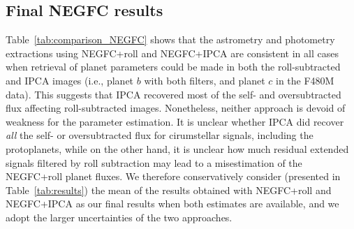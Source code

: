 \documentclass[longauth]{aa}
\begin{document}
\begin{appendix}
\subsection{Final NEGFC results} 

Table~\ref{tab:comparison_NEGFC} shows that the astrometry and photometry extractions using NEGFC+roll and NEGFC+IPCA are consistent in all cases when retrieval of planet parameters could be made in both the roll-subtracted and IPCA images (i.e., planet $b$ with both filters, and planet $c$ in the F480M data). This suggests that IPCA recovered most of the self- and oversubtracted flux affecting roll-subtracted images. Nonetheless, neither approach is devoid of weakness for the parameter estimation. It is unclear whether IPCA did recover \textit{all} the self- or oversubtracted flux for cirumstellar signals, including the protoplanets, while on the other hand, it is unclear how much residual extended signals filtered by roll subtraction may lead to a misestimation of the NEGFC+roll planet fluxes. We therefore conservatively consider (presented in Table~\ref{tab:results}) the mean of the results obtained with NEGFC+roll and NEGFC+IPCA as our final results when both estimates are available, and we adopt the larger uncertainties of the two approaches. %




\end{appendix}
\end{document}
